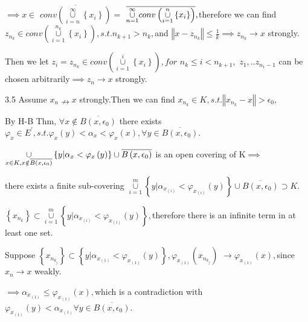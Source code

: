 \documentclass{article}
\begin{document}
$\implies x\in $ $\overline{conv\left( \underset{i=n}{\overset{\infty }{\cup 
}}\left\{ x_{i}\right\} \right) }=$ $\overline{\underset{n=1}{\overset{%
\infty }{\cup }}conv\left( \underset{i=1}{\overset{n}{\cup }}\left\{
x_{i}\right\} \right) },$therefore we can find $z_{n_{k}}\in conv\left( 
\underset{i=1}{\overset{n_{k}}{\cup }}\left\{ x_{i}\right\} \right)
,s.t.n_{k+1}>n_{k},$and $\left\Vert x-z_{n_{k}}\right\Vert \leq \frac{1}{k}%
\implies z_{n_{k}}\rightarrow x$ strongly.

Then we let $z_{i}=z_{n_{k}}\in conv\left( \underset{i=1}{\overset{i}{\cup }}%
\left\{ x_{i}\right\} \right) ,for$ $n_{k}\leq i<n_{k+1},$ $%
z_{1},..z_{n_{1}-1}$ can be chosen arbitrarily$\implies z_{n}\rightarrow x$
strongly.

3.5 Assume $x_{n}\nrightarrow x$ strongly.Then we can find $x_{n_{k}}\in
K,s.t.\left\Vert x_{n_{k}}-x\right\Vert >\epsilon _{0},$

By H-B Thm, $\forall x\notin \overline{B\left( x,\epsilon _{0}\right) }$
there exists $\varphi _{x}\in E^{\prime },s.t.\varphi _{x}\left( y\right)
<\alpha _{x}<\varphi _{x}\left( x\right) ,\forall y\in \overline{B\left(
x,\epsilon _{0}\right) }.$

$\underset{x\in K,x\notin \overline{B\left( x,\epsilon _{0}\right) }}{\cup }%
\left\{ y|\alpha _{x}<\varphi _{x}\left( y\right) \right\} \cup \overline{%
B\left( x,\epsilon _{0}\right) }$ is an open covering of K$\implies $

there exists a finite sub-covering $\underset{i=1}{\overset{m}{\cup }}%
\left\{ y|\alpha _{x_{\left( i\right) }}<\varphi _{x_{\left( i\right)
}}\left( y\right) \right\} \cup \overline{B\left( x,\epsilon _{0}\right) }%
\supset K.$

$\left\{ x_{n_{k}}\right\} \subset \underset{i=1}{\overset{m}{\cup }}\left\{
y|\alpha _{x_{\left( i\right) }}<\varphi _{x_{\left( i\right) }}\left(
y\right) \right\} ,$therefore there is an infinite term in at least one set.

Suppose $\left\{ x_{n_{k_{j}}}\right\} \subset \left\{ y|\alpha _{x_{\left(
1\right) }}<\varphi _{x_{\left( 1\right) }}\left( y\right) \right\} ,\varphi
_{x_{\left( 1\right) }}\left( x_{n_{k_{j}}}\right) $ $\rightarrow \varphi
_{x_{\left( 1\right) }}\left( x\right) ,$since $x_{n}\rightarrow x$ weakly.

$\implies \alpha _{x_{\left( 1\right) }}\leq \varphi _{x_{\left( 1\right)
}}\left( x\right) ,$which is a contradiction with $\varphi _{x_{\left(
1\right) }}\left( y\right) <\alpha _{x_{\left( 1\right) }}\forall y\in 
\overline{B\left( x,\epsilon _{0}\right) }.$
\end{document}
